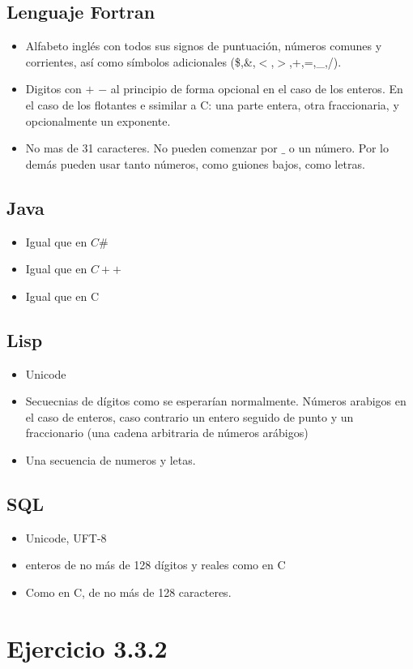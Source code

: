 \documentclass{article}
\begin{document}
\subsection*{Lenguaje Fortran}
\begin{itemize}
	\item Alfabeto inglés con todos sus signos de puntuación, números comunes y corrientes, así como símbolos adicionales (\$,\&,$<$,$>$,+,=,\_,/).
	\item Digitos con $+$ $-$ al principio de forma opcional en el caso de los enteros. En el caso de los flotantes e ssimilar a C: una parte entera, otra fraccionaria, y opcionalmente un exponente.
	\item No mas de 31 caracteres. No pueden comenzar por $\_$ o un número. Por lo demás pueden usar tanto números, como guiones bajos, como letras.
\end{itemize}
\subsection*{Java}
\begin{itemize}
	\item Igual que en $C\#$
	\item Igual que en $C++$
	\item Igual que en C
\end{itemize}
\subsection*{Lisp}
\begin{itemize}
	\item Unicode
	\item Secuecnias de dígitos como se esperarían normalmente. Números arabigos en el caso de enteros, caso contrario un entero seguido de punto y un fraccionario (una cadena arbitraria de números arábigos)
	\item Una secuencia de numeros y letas.
\end{itemize}
\subsection*{SQL}
\begin{itemize}
	\item Unicode, UFT-8
	\item enteros de no más de 128 dígitos y reales como en C
	\item Como en C, de no más de 128 caracteres.
\end{itemize}
\section*{Ejercicio 3.3.2}
\end{document}
